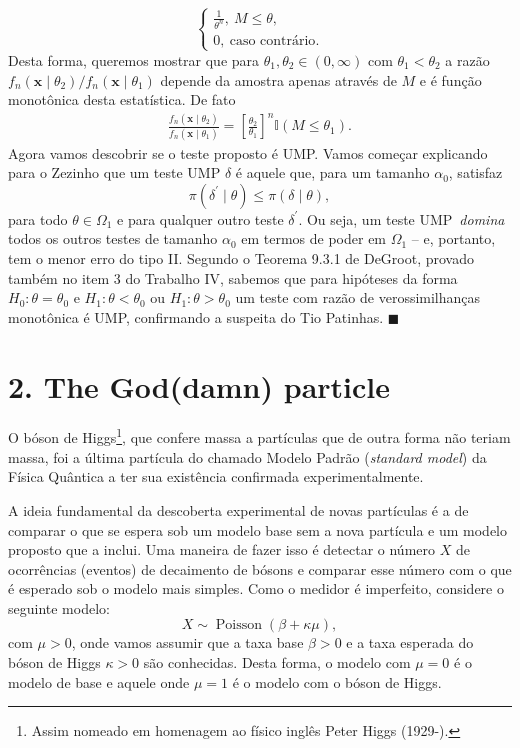 \documentclass[a4paper,10pt, notitlepage]{report}
\newcommand{\bx}{\boldsymbol{x}} %
\begin{document}
{\begin{equation*}
\begin{cases}
 \frac{1}{\theta^n},\: M \leq \theta,\\
   0,\:\text{caso contrário}.
                         \end{cases}
\end{equation*}
Desta forma, queremos mostrar que para $\theta_1, \theta_2 \in (0, \infty)$ com $\theta_1 < \theta_2$ a razão $f_n(\bx \mid \theta_2)/ f_n(\bx \mid \theta_1)$ depende da amostra apenas através de $M$ e é função monotônica desta estatística.
De fato
\begin{align*}
 \frac{f_n(\bx \mid \theta_2)}{ f_n(\bx \mid \theta_1)} = \left[\frac{\theta_2}{\theta_1}\right]^n\mathbb{I}(M \leq \theta_1).
\end{align*}
Agora vamos descobrir se o teste proposto é UMP.
Vamos começar explicando para o Zezinho que um teste UMP $\delta$ é aquele que, para um tamanho $\alpha_0$, satisfaz 
\begin{equation*}
 \pi(\delta^\prime \mid \theta) \leq \pi(\delta \mid \theta),
\end{equation*}
para todo $\theta \in \Omega_1$ e para qualquer outro teste $\delta^\prime$.
Ou seja, um teste UMP~\textit{domina} todos os outros testes de tamanho $\alpha_0$ em termos de poder em $\Omega_1$ -- e, portanto, tem o menor erro do tipo II.
Segundo o Teorema 9.3.1 de DeGroot, provado também no item 3 do Trabalho IV, sabemos que para hipóteses da forma $H_0: \theta = \theta_0$  e $H_1 : \theta < \theta_0$ ou $H_1: \theta > \theta_0$ um teste com razão de verossimilhanças monotônica é UMP, confirmando a suspeita do Tio Patinhas.
$\blacksquare$
}

\section*{2. The God(damn) particle}

O bóson de Higgs\footnote{Assim nomeado em homenagem ao físico inglês Peter Higgs (1929-).}, que confere massa a partículas que de outra forma não teriam massa, foi a última partícula do chamado Modelo Padrão (\textit{standard model}) da Física Quântica a ter sua existência confirmada experimentalmente.

A ideia fundamental da descoberta experimental de novas partículas é a de comparar o que se espera sob um modelo base sem a nova partícula e um modelo proposto que a inclui.
Uma maneira de fazer isso é detectar o número $X$ de ocorrências (eventos) de decaimento de bósons e comparar esse número com o que é esperado sob o modelo mais simples.
Como o medidor é imperfeito, considere o seguinte modelo:
\begin{equation*}
 X \sim \operatorname{Poisson}(\beta  + \kappa\mu),
\end{equation*}
com $\mu >0$, onde vamos assumir que a taxa base $\beta > 0$ e a taxa esperada do bóson de Higgs $\kappa >0$ são conhecidas.
Desta forma, o modelo com $\mu = 0$ é o modelo de base e aquele onde $\mu =1$ é o modelo com o bóson de Higgs.
\end{document}
